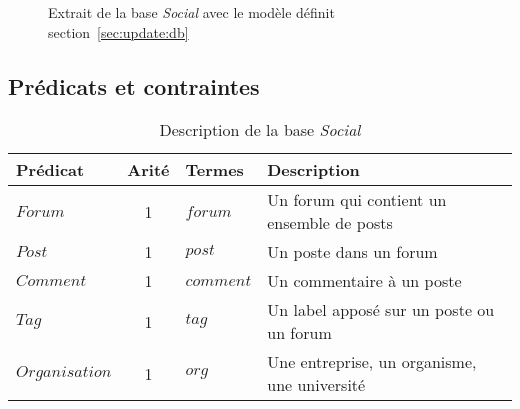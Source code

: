 \begin{figure}[H]
    \caption{Extrait de la base \textit{Social} avec le modèle définit section~\ref{sec:update:db}}
\end{figure}

\subsection{Prédicats et contraintes}

\begin{table}[H]
    \centering
    \begin{adjustbox}{width=\linewidth}
        \begin{tabular}{l|c|l|l}
            Prédicat & Arité & Termes & Description \\
            \hline
            \hline
            $Forum$ & 1 & $forum$ & Un forum qui contient un ensemble de posts \\
            $Post$ & 1 & $post$ & Un poste dans un forum \\
            $Comment$ & 1 & $comment$ & Un commentaire à un poste \\
            $Tag$ & 1 & $tag$ & Un label apposé sur un poste ou un forum \\
            $Organisation$ & 1 & $org$ & Une entreprise, un organisme, une université \\
        \end{tabular}
    \end{adjustbox}
    \caption{Description de la base \textit{Social}}
\end{table}

